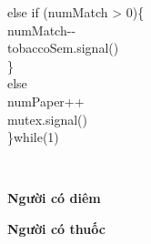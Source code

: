 {\begin{minipage}[t]{.29\linewidth}
{\begin{minipage}[t]{\linewidth}
        \hspace*{20pt}else if (numMatch > 0)\{\\
        \hspace*{30pt}numMatch-\--\\
        \hspace*{30pt}tobaccoSem.signal()\\
        \hspace*{20pt}\}\\
        \hspace*{20pt}else\\
        \hspace*{30pt}numPaper++\\
        \hspace*{10pt}mutex.signal()\\
    \}while(1)
    \end{minipage}
    }
\end{minipage}\\[10pt]
\begin{minipage}[t]{.29\linewidth}
    \begin{center}
        {\bfseries Người có diêm}
    \end{center}
\end{minipage}
\hfill
\begin{minipage}[t]{.29\linewidth}
    \begin{center}
        {\bfseries Người có thuốc}
    \end{center}
\end{minipage}}
